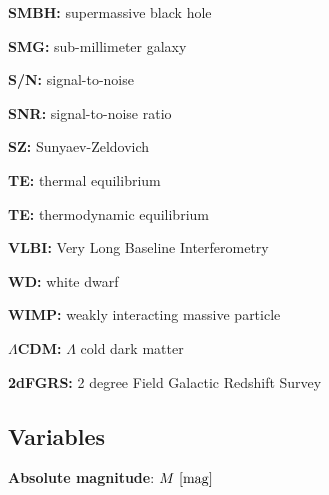 \documentclass[a4paper,11pt]{article}
\begin{document}
{\noindent}\textbf{SMBH:} supermassive black hole

{\noindent}\textbf{SMG:} sub-millimeter galaxy

{\noindent}\textbf{S/N:} signal-to-noise

{\noindent}\textbf{SNR:} signal-to-noise ratio

{\noindent}\textbf{SZ:} Sunyaev-Zeldovich

{\noindent}\textbf{TE:} thermal equilibrium

{\noindent}\textbf{TE:} thermodynamic equilibrium

{\noindent}\textbf{VLBI:} Very Long Baseline Interferometry

{\noindent}\textbf{WD:} white dwarf

{\noindent}\textbf{WIMP:} weakly interacting massive particle

{\noindent}\textbf{$\Lambda$CDM:} $\Lambda$ cold dark matter

{\noindent}\textbf{2dFGRS:} 2 degree Field Galactic Redshift Survey








































\newpage
\subsection{Variables}

{\noindent}\textbf{Absolute magnitude}: $M ~ [{\rm mag}]$
\end{document}
